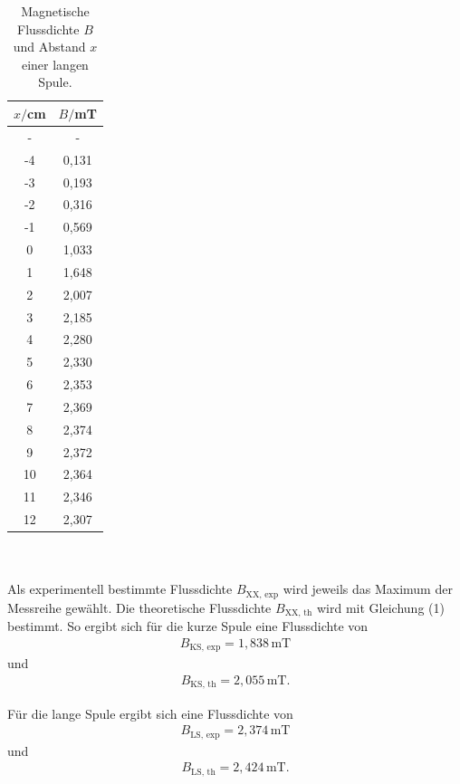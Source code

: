 \begin{minipage}{0.5\textwidth}
\begin{table}[H]
  \centering
  \caption{Magnetische Flussdichte $B$ \\ und Abstand $x$ einer langen Spule.}
  \begin{tabular}{c c}
    \toprule
     $x/$cm & $B/$mT  \\
    \midrule
    - & - \\
    -4 & 0,131 \\
    -3 & 0,193 \\
    -2 & 0,316 \\
    -1 & 0,569 \\
    0 & 1,033\\
    1 & 1,648 \\
    2 & 2,007 \\
    3 & 2,185 \\
    4 & 2,280 \\
    5 & 2,330 \\
    6 & 2,353 \\
    7 & 2,369 \\
    8 & 2,374 \\
    9 & 2,372 \\
    10 & 2,364 \\
    11 & 2,346 \\
    12 & 2,307 \\
  \bottomrule
  \end{tabular}
\end{table}
\end{minipage}
\\~\\

Als experimentell bestimmte Flussdichte $B_\text{XX, exp}$ wird jeweils das Maximum der Messreihe gewählt.
Die theoretische Flussdichte $B_\text{XX, th}$ wird mit Gleichung (1) bestimmt.
So ergibt sich für die kurze Spule eine Flussdichte von 
\begin{align*}
B_\text{KS, exp} = 1,838\,\si{\milli\tesla}
\end{align*}
und
\begin{align*}
B_\text{KS, th} = 2,055\,\si{\milli\tesla}.
\end{align*}

Für die lange Spule ergibt sich eine Flussdichte von 
\begin{align*}
B_\text{LS, exp} = 2,374\,\si{\milli\tesla}
\end{align*}
und
\begin{align*}
B_\text{LS, th} = 2,424\,\si{\milli\tesla}.
\end{align*}

